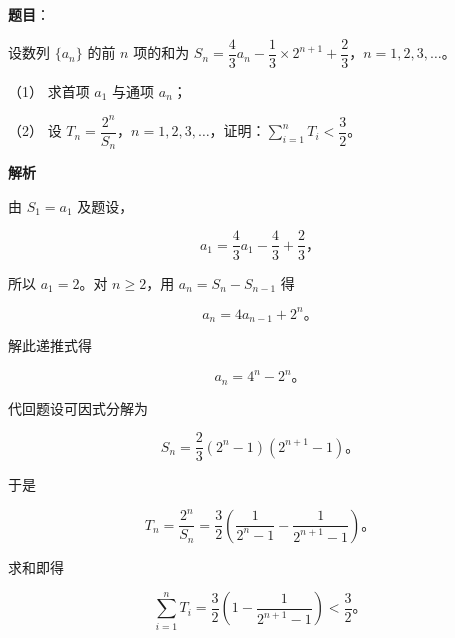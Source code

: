 \begin{answer}

\textbf{题目}：

设数列 $\{a_n\}$ 的前 $n$ 项的和为 $S_n=\dfrac43a_n-\dfrac13\times2^{n+1}+\dfrac23$，$n=1,2,3,\ldots$。

（1） 求首项 $a_1$ 与通项 $a_n$；

（2） 设 $T_n=\dfrac{2^n}{S_n}$，$n=1,2,3,\ldots$，证明：$\displaystyle\sum_{i=1}^nT_i<\dfrac32$。

\textbf{解析}


由 $S_1=a_1$ 及题设，

\nopagebreak[4]
\[
a_1=\frac43a_1-\frac43+\frac23\text{，}
\]

所以 $a_1=2$。对 $n\geqslant2$，用 $a_n=S_n-S_{n-1}$ 得

\nopagebreak[4]
\[
a_n=4a_{n-1}+2^n\text{。}
\]

解此递推式得

\nopagebreak[4]
\[
a_n=4^n-2^n\text{。}
\]


代回题设可因式分解为

\nopagebreak[4]
\[
S_n=\frac23(2^n-1)(2^{n+1}-1)\text{。}
\]

于是

\nopagebreak[4]
\[
T_n=\frac{2^n}{S_n}
=\frac32\left(\frac1{2^n-1}-\frac1{2^{n+1}-1}\right)\text{。}
\]

求和即得

\nopagebreak[4]
\[
\sum_{i=1}^nT_i=\frac32\left(1-\frac1{2^{n+1}-1}\right)<\frac32\text{。}
\]



\end{answer}